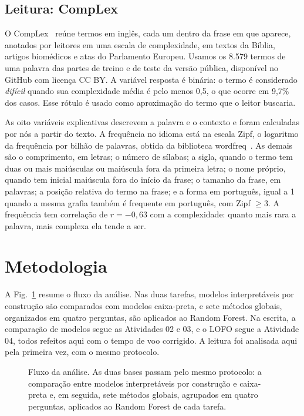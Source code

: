 \documentclass[conference]{IEEEtran}
\newcommand{\RF}{Random Forest}
\begin{document}
\subsection{Leitura: CompLex}

O CompLex~\cite{shardlow2020complex} reúne termos em inglês, cada um dentro da
frase em que aparece, anotados por leitores em uma escala de complexidade, em
textos da Bíblia, artigos biomédicos e atas do Parlamento Europeu. Usamos os
8.579 termos de uma palavra das partes de treino e de teste da versão pública,
disponível no GitHub com licença CC BY. A variável resposta é binária: o termo é
considerado \emph{difícil} quando sua complexidade média é pelo menos 0,5, o
que ocorre em 9,7\% dos casos. Esse rótulo é usado como aproximação do termo
que o leitor buscaria.

As oito variáveis explicativas descrevem a palavra e o contexto e foram
calculadas por nós a partir do texto. A frequência no idioma está na escala
Zipf, o logaritmo da frequência por bilhão de palavras, obtida da biblioteca
wordfreq~\cite{speer2022wordfreq}. As demais são o comprimento, em letras; o
número de sílabas; a sigla, quando o termo tem duas ou mais maiúsculas ou
maiúscula fora da primeira letra; o nome próprio, quando tem inicial maiúscula
fora do início da frase; o tamanho da frase, em palavras; a posição relativa do
termo na frase; e a forma em português, igual a 1 quando a mesma grafia também
é frequente em português, com Zipf $\geq 3$. A frequência tem correlação de
$r = -0,63$ com a complexidade: quanto mais rara a palavra, mais complexa ela
tende a ser.

\section{Metodologia}

A Fig.~\ref{fig:fluxo} resume o fluxo da análise. Nas duas tarefas, modelos
interpretáveis por construção são comparados com modelos caixa-preta, e sete
métodos globais, organizados em quatro perguntas, são aplicados ao \RF{}. Na
escrita, a comparação de modelos segue as Atividades 02 e 03, e o LOFO segue a
Atividade 04, todos refeitos aqui com o tempo de voo corrigido. A leitura foi
analisada aqui pela primeira vez, com o mesmo protocolo.

\begin{figure}[!t]
\centering

\caption{Fluxo da análise. As duas bases passam pelo mesmo protocolo: a
comparação entre modelos interpretáveis por construção e caixa-preta e, em
seguida, sete métodos globais, agrupados em quatro perguntas, aplicados ao
Random Forest de cada tarefa.}
\label{fig:fluxo}
\end{figure}
\end{document}
